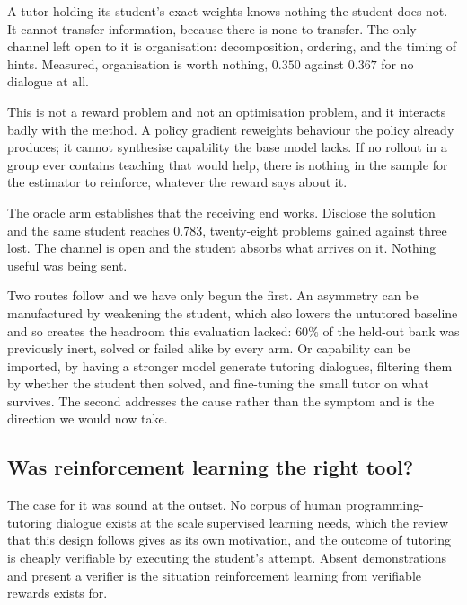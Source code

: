 A tutor holding its student's exact weights knows nothing the student does not.
It cannot transfer information, because there is none to transfer. The only
channel left open to it is organisation: decomposition, ordering, and the
timing of hints. Measured, organisation is worth nothing, $0.350$ against
$0.367$ for no dialogue at all.

This is not a reward problem and not an optimisation problem, and it interacts
badly with the method. A policy gradient reweights behaviour the policy already
produces; it cannot synthesise capability the base model lacks. If no rollout
in a group ever contains teaching that would help, there is nothing in the
sample for the estimator to reinforce, whatever the reward says about it.

The oracle arm establishes that the receiving end works. Disclose the solution
and the same student reaches $0.783$, twenty-eight problems gained against
three lost. The channel is open and the student absorbs what arrives on it.
Nothing useful was being sent.

Two routes follow and we have only begun the first. An asymmetry can be
manufactured by weakening the student, which also lowers the untutored baseline
and so creates the headroom this evaluation lacked: $60\%$ of the held-out bank
was previously inert, solved or failed alike by every arm. Or capability can be
imported, by having a stronger model generate tutoring dialogues, filtering
them by whether the student then solved, and fine-tuning the small tutor on
what survives. The second addresses the cause rather than the symptom and is
the direction we would now take.


\subsection{Was reinforcement learning the right tool?}
\label{sec:method-choice}

The case for it was sound at the outset. No corpus of human programming-tutoring
dialogue exists at the scale supervised learning needs, which the review that
this design follows gives as its own motivation, and the outcome of tutoring is
cheaply verifiable by executing the student's attempt. Absent demonstrations and
present a verifier is the situation reinforcement learning from verifiable
rewards exists for.


